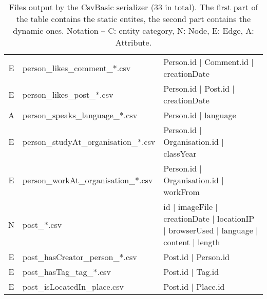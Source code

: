 \begin{table}[htb]
\begin{tabular}{|c|p{4.6cm}|p{9.8cm}|}
        E                       & person\_likes\_comment\_*.csv           & Person.id | Comment.id | creationDate                                                   \\
        E                       & person\_likes\_post\_*.csv              & Person.id | Post.id | creationDate                                                      \\
        A                       & person\_speaks\_language\_*.csv         & Person.id | language                                                                    \\
        E                       & person\_studyAt\_organisation\_*.csv    & Person.id | Organisation.id | classYear                                                 \\
        E                       & person\_workAt\_organisation\_*.csv     & Person.id | Organisation.id | workFrom                                                  \\
        \hline
        N                       & post\_*.csv                             & id | imageFile | creationDate | locationIP | browserUsed | language | content | length  \\
        E                       & post\_hasCreator\_person\_*.csv         & Post.id | Person.id                                                                     \\
        E                       & post\_hasTag\_tag\_*.csv                & Post.id | Tag.id                                                                        \\
        E                       & post\_isLocatedIn\_place.csv            & Post.id | Place.id                                                                      \\
        \hline
    \end{tabular}
    \caption{Files output by the CsvBasic serializer (33 in total). The first part of the table contains the static entites, the second part contains the dynamic ones. Notation -- C: entity category, N: Node, E: Edge, A: Attribute.}
    \label{table:csv_basic}
\end{table}
